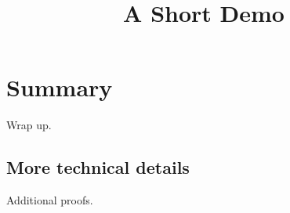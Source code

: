 \documentclass[article]{jss}
\title{A Short Demo}
\begin{document}
\section{Summary}
Wrap up.

\begin{appendix}
\section{More technical details}
Additional proofs.
\end{appendix}
\end{document}
